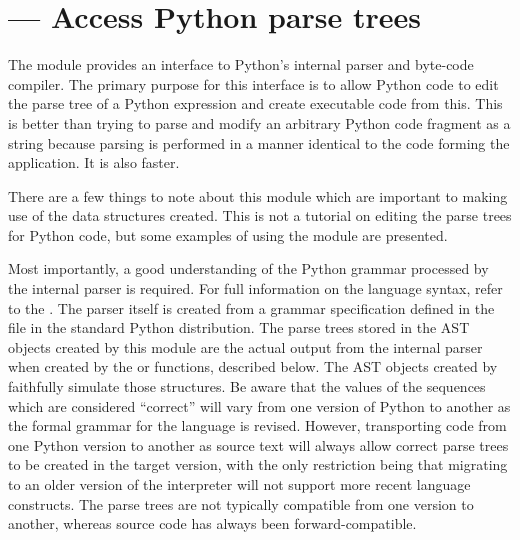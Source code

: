 \section{ ---
         Access Python parse trees}





The  module provides an interface to Python's internal
parser and byte-code compiler.  The primary purpose for this interface
is to allow Python code to edit the parse tree of a Python expression
and create executable code from this.  This is better than trying
to parse and modify an arbitrary Python code fragment as a string
because parsing is performed in a manner identical to the code
forming the application.  It is also faster.

There are a few things to note about this module which are important
to making use of the data structures created.  This is not a tutorial
on editing the parse trees for Python code, but some examples of using
the  module are presented.

Most importantly, a good understanding of the Python grammar processed
by the internal parser is required.  For full information on the
language syntax, refer to the .  The parser itself is created from a grammar
specification defined in the file  in the
standard Python distribution.  The parse trees stored in the AST
objects created by this module are the actual output from the internal
parser when created by the  or 
functions, described below.  The AST objects created by
 faithfully simulate those structures.  Be
aware that the values of the sequences which are considered
``correct'' will vary from one version of Python to another as the
formal grammar for the language is revised.  However, transporting
code from one Python version to another as source text will always
allow correct parse trees to be created in the target version, with
the only restriction being that migrating to an older version of the
interpreter will not support more recent language constructs.  The
parse trees are not typically compatible from one version to another,
whereas source code has always been forward-compatible.

